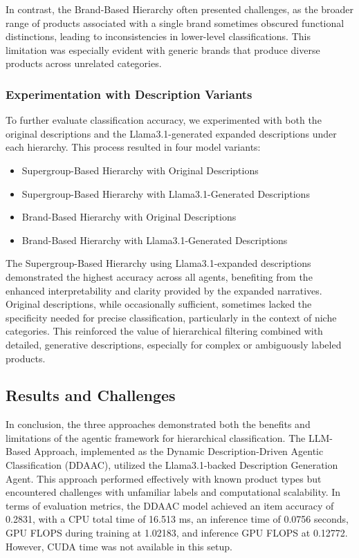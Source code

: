 \documentclass[9pt,a4paper,twoside]{rho-class/rho}
\begin{document}
In contrast, the Brand-Based Hierarchy often presented challenges, as the broader range of products associated with a single brand sometimes obscured functional distinctions, leading to inconsistencies in lower-level classifications. This limitation was especially evident with generic brands that produce diverse products across unrelated categories.

\subsubsection{Experimentation with Description Variants}
To further evaluate classification accuracy, we experimented with both the original descriptions and the Llama3.1-generated expanded descriptions under each hierarchy. This process resulted in four model variants:
\begin{itemize}
    \item Supergroup-Based Hierarchy with Original Descriptions
    \item Supergroup-Based Hierarchy with Llama3.1-Generated Descriptions
    \item Brand-Based Hierarchy with Original Descriptions
    \item Brand-Based Hierarchy with Llama3.1-Generated Descriptions
\end{itemize}

The Supergroup-Based Hierarchy using Llama3.1-expanded descriptions demonstrated the highest accuracy across all agents, benefiting from the enhanced interpretability and clarity provided by the expanded narratives. Original descriptions, while occasionally sufficient, sometimes lacked the specificity needed for precise classification, particularly in the context of niche categories. This reinforced the value of hierarchical filtering combined with detailed, generative descriptions, especially for complex or ambiguously labeled products.

\subsection{Results and Challenges}
In conclusion, the three approaches demonstrated both the benefits and limitations of the agentic framework for hierarchical classification. The LLM-Based Approach, implemented as the Dynamic Description-Driven Agentic Classification (DDAAC), utilized the Llama3.1-backed Description Generation Agent. This approach performed effectively with known product types but encountered challenges with unfamiliar labels and computational scalability. In terms of evaluation metrics, the DDAAC model achieved an item accuracy of 0.2831, with a CPU total time of 16.513 ms, an inference time of 0.0756 seconds, GPU FLOPS during training at 1.02183, and inference GPU FLOPS at 0.12772. However, CUDA time was not available in this setup.
\end{document}
